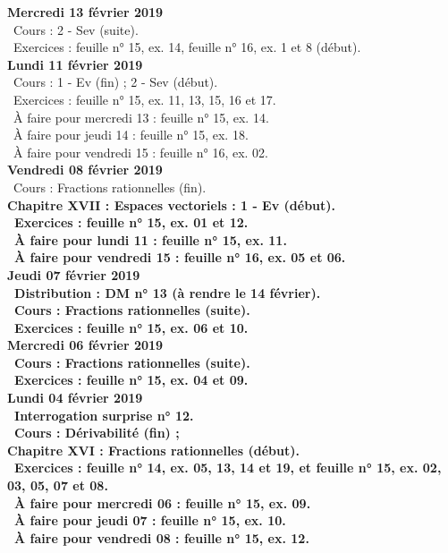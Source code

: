 \documentclass[12pt,a4paper]{article}
\begin{document}
\noindent\textbf{Mercredi 13 février 2019} \\
\bu\ Cours : 2 - Sev (suite).\\
\bu\ Exercices : feuille n° 15, ex. 14, feuille n° 16, ex. 1 et 8 (début).\vspace{.4cm}\\

\noindent\textbf{\bf Lundi 11 février 2019} \\
\bu\ Cours : 1 - Ev (fin) ; 2 - Sev (début).\\
\bu\ Exercices : feuille n° 15, ex. 11, 13, 15, 16 et 17.\\
\bu\ À faire pour mercredi 13 : feuille n° 15, ex. 14.\\
\bu\ À faire pour jeudi 14 : feuille n° 15, ex. 18.\\
\bu\ À faire pour vendredi 15 : feuille n° 16, ex. 02.\vspace{.4cm}\\

\noindent\textbf{Vendredi 08 février 2019}\\
\bu\ Cours : Fractions rationnelles (fin).\\
\bf Chapitre XVII \rm : Espaces vectoriels : 1 - Ev (début).\\
\bu\ Exercices : feuille n° 15, ex. 01 et 12.\\
\bu\ À faire pour lundi 11 : feuille n° 15, ex. 11.\\
\bu\ À faire pour vendredi 15 : feuille n° 16, ex. 05 et 06.\vspace{.4cm}\\
 
\noindent\textbf{Jeudi 07 février 2019}\\
\bu\ Distribution : DM n° 13 (à rendre le 14 février).\\
\bu\ Cours : Fractions rationnelles (suite).\\
\bu\ Exercices : feuille n° 15, ex. 06 et 10.\vspace{.4cm}\\
 
\noindent\textbf{Mercredi 06 février 2019} \\
\bu\ Cours : Fractions rationnelles (suite).\\
\bu\ Exercices : feuille n° 15, ex. 04 et 09.\vspace{.4cm}\\
 
\noindent\textbf{\bf Lundi 04 février 2019} \\
\bu\ Interrogation surprise n° 12.\\
\bu\ Cours :  Dérivabilité (fin) ;\\
\bf Chapitre XVI \rm : Fractions rationnelles (début).\\
\bu\ Exercices : feuille n° 14, ex. 05, 13, 14 et 19, et feuille n° 15, ex. 02, 03, 05, 07 et 08.\\
\bu\ À faire pour mercredi 06 : feuille n° 15, ex. 09.\\
\bu\ À faire pour jeudi 07 : feuille n° 15, ex. 10.\\
\bu\ À faire pour vendredi 08 : feuille n° 15, ex. 12.\vspace{.4cm}\\
 
\end{document}
